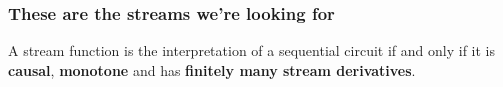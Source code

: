 \begin{frame}
    \frametitle{These are the streams we're looking for}

    \begin{theorem}
        A stream function is the interpretation of a sequential circuit
        if and only if it is \textbf{causal}, \textbf{monotone} and has
        \textbf{finitely many stream derivatives}.
    \end{theorem}
\end{frame}